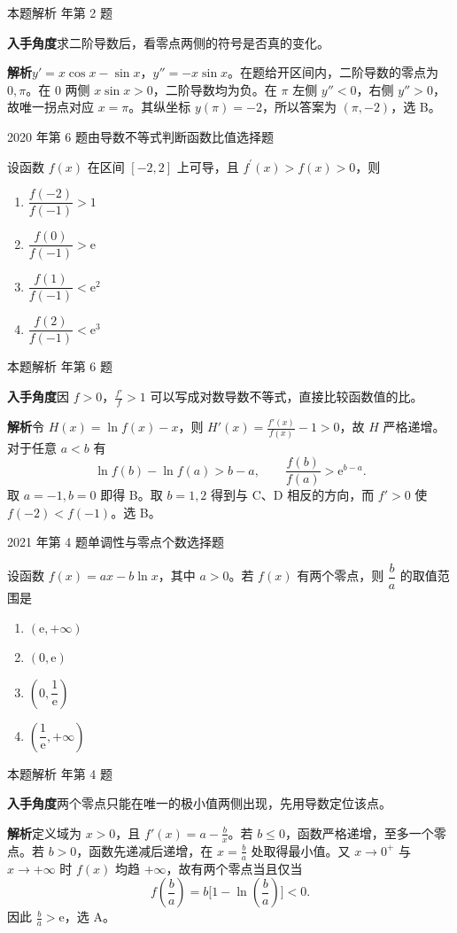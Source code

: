 \documentclass[UTF8,zihao=-4,fontset=fandol]{ctexart}
\newenvironment{abcd}{\begin{enumerate}[label=\textup{(\Alph*)},leftmargin=2.3em,itemsep=1pt,topsep=4pt,parsep=1pt]}{\end{enumerate}}
\newcommand{\choices}[4]{%
  \begin{abcd}
    \item #1
    \item #2
    \item #3
    \item #4
  \end{abcd}}
\newcommand{\QuestionPage}[6]{%
  \par\noindent\begin{minipage}{\linewidth}
  \raggedright
  {\small\textcolor{black!60}{#3\quad #5}\hfill\textcolor{accent}{#2}}\par\smallskip}
\newcommand{\QuestionEnd}{\end{minipage}\par\medskip}
\newcommand{\QuestionPage}[6]{%
  \clearpage
  {\small\textcolor{accent}{#1\hfill #2}}\par\medskip
  {\small\textcolor{black!60}{#3\quad #5\hfill #6}}\par\vspace{9bp}}
\newcommand{\QuestionEnd}{}
\newenvironment{QuestionSolution}[1]{%
  \clearpage
  {\small\textcolor{black!60}{本题解析\quad #1}}\par\medskip
}{\par\clearpage}
\begin{document}
\begin{QuestionSolution}{2019 年第 2 题}
\textbf{入手角度}\quad 求二阶导数后，看零点两侧的符号是否真的变化。

\textbf{解析}\quad \(y'=x\cos x-\sin x\)，\(y''=-x\sin x\)。在题给开区间内，二阶导数的零点为 \(0,\pi\)。在 \(0\) 两侧 \(x\sin x>0\)，二阶导数均为负。在 \(\pi\) 左侧 \(y''<0\)，右侧 \(y''>0\)，故唯一拐点对应 \(x=\pi\)。其纵坐标 \(y(\pi)=-2\)，所以答案为 \(\boxed{(\pi,-2)}\)，选 B。
\end{QuestionSolution}

\QuestionPage{2.6 函数性态的研究}{选择题}{2020 年第 6 题}{1}{由导数不等式判断函数比值}{111 / 234}
设函数 \(f\left( x \right)\) 在区间 \(\left[ -2,2 \right]\) 上可导，且 \(f^{\prime}\left( x \right) > f\left( x \right) > 0\)，则
\choices{\(\dfrac{f\left( -2 \right)}{f\left( -1 \right)} > 1\)}{\(\dfrac{f\left( 0 \right)}{f\left( -1 \right)} > \mathrm{e}\)}{\(\dfrac{f\left( 1 \right)}{f\left( -1 \right)} < \mathrm{e}^{2}\)}{\(\dfrac{f\left( 2 \right)}{f\left( -1 \right)} < \mathrm{e}^{3}\)}
\QuestionEnd

\begin{QuestionSolution}{2020 年第 6 题}
\textbf{入手角度}\quad 因 \(f>0\)，\(\frac{f'}{f}>1\) 可以写成对数导数不等式，直接比较函数值的比。

\textbf{解析}\quad 令 \(H(x)=\ln f(x)-x\)，则 \(H'(x)=\frac{f'(x)}{f(x)}-1>0\)，故 \(H\) 严格递增。对于任意 \(a<b\) 有
\[
\ln f(b)-\ln f(a)>b-a,
\qquad \frac{f(b)}{f(a)}>\mathrm{e}^{b-a}.
\]
取 \(a=-1,b=0\) 即得 B。取 \(b=1,2\) 得到与 C、D 相反的方向，而 \(f'>0\) 使 \(f(-2)<f(-1)\)。选 B。
\end{QuestionSolution}

\QuestionPage{2.6 函数性态的研究}{选择题}{2021 年第 4 题}{1}{单调性与零点个数}{112 / 234}
设函数 \(f(x)=ax-b\ln x\)，其中 \(a>0\)。若 \(f(x)\) 有两个零点，则 \(\dfrac{b}{a}\) 的取值范围是
\choices{\(\left(\mathrm{e},+\infty\right)\)}{\(\left(0,\mathrm{e}\right)\)}{\(\left(0,\dfrac{1}{\mathrm{e}}\right)\)}{\(\left(\dfrac{1}{\mathrm{e}},+\infty\right)\)}
\QuestionEnd

\begin{QuestionSolution}{2021 年第 4 题}
\textbf{入手角度}\quad 两个零点只能在唯一的极小值两侧出现，先用导数定位该点。

\textbf{解析}\quad 定义域为 \(x>0\)，且 \(f'(x)=a-\frac{b}{x}\)。若 \(b\le0\)，函数严格递增，至多一个零点。若 \(b>0\)，函数先递减后递增，在 \(x=\frac{b}{a}\) 处取得最小值。又 \(x\to0^+\) 与 \(x\to+\infty\) 时 \(f(x)\) 均趋 \(+\infty\)，故有两个零点当且仅当
\[
f(\frac{b}{a})=b\bigl[1-\ln(\frac{b}{a})\bigr]<0.
\]
因此 \(\frac{b}{a}>\mathrm{e}\)，选 A。
\end{QuestionSolution}
\end{document}

